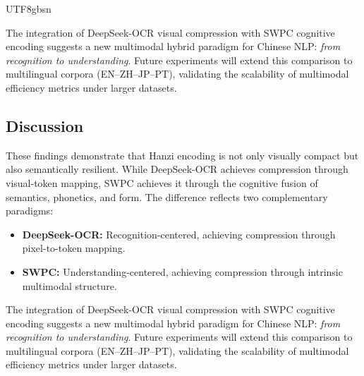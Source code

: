 \documentclass[conference]{IEEEtran}
\begin{document}
\begin{CJK*}{UTF8}{gbsn}

The integration of DeepSeek-OCR visual compression with SWPC cognitive encoding suggests a new multimodal hybrid paradigm for Chinese NLP:  
\textit{from recognition to understanding}.  
Future experiments will extend this comparison to multilingual corpora (EN–ZH–JP–PT), validating the scalability of multimodal efficiency metrics under larger datasets.

\subsection{Discussion}

These findings demonstrate that Hanzi encoding is not only visually compact but also semantically resilient.  
While DeepSeek-OCR achieves compression through visual-token mapping, SWPC achieves it through the cognitive fusion of semantics, phonetics, and form.  
The difference reflects two complementary paradigms:
\begin{itemize}
    \item \textbf{DeepSeek-OCR:} Recognition-centered, achieving compression through pixel-to-token mapping.
    \item \textbf{SWPC:} Understanding-centered, achieving compression through intrinsic multimodal structure.
\end{itemize}


The integration of DeepSeek-OCR visual compression with SWPC cognitive encoding suggests a new multimodal hybrid paradigm for Chinese NLP:  
\textit{from recognition to understanding}.  
Future experiments will extend this comparison to multilingual corpora (EN–ZH–JP–PT), validating the scalability of multimodal efficiency metrics under larger datasets.


\end{CJK*}
\end{document}
